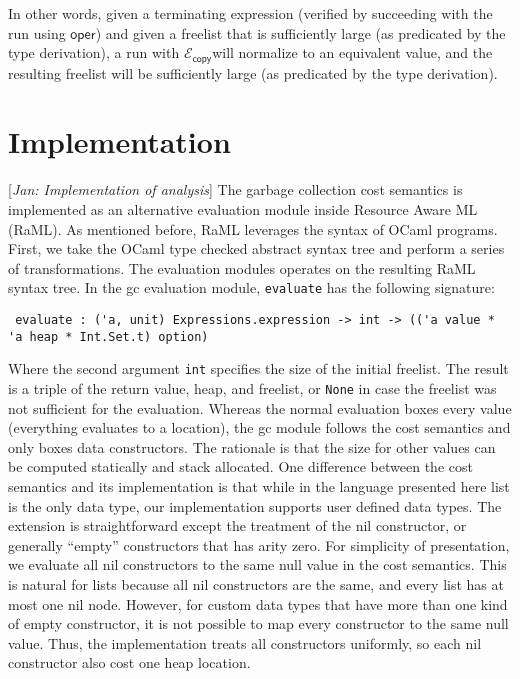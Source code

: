 \documentclass{easychair}
\newcommand{\ms}[1]{\ensuremath{\mathsf{#1}}}
\newcommand{\jan}[1]{{\color{red} [\emph{Jan: #1}]}}
\newcommand{\copySem}{\ensuremath{\mathcal{E}_{\ms{copy}}}}
\theoremstyle{definition}
\begin{document}
In other words, given a terminating expression (verified by succeeding with the run using \ms{oper})
and given a freelist that is sufficiently large (as predicated by the type derivation), 
a run with \copySem will normalize to an equivalent value, and the resulting freelist 
will be sufficiently large (as predicated by the type derivation).






\section{Implementation}
\label{sect:implementation}

\jan{Implementation of analysis}
The garbage collection cost semantics is implemented as an alternative evaluation module inside
Resource Aware ML (RaML). As mentioned before, RaML leverages the syntax of OCaml programs. 
First, we take the OCaml type checked abstract syntax tree and perform a series of transformations. 
The evaluation modules operates on the resulting RaML syntax tree. 
In the gc evaluation module, \texttt{evaluate} has the following signature:

\begin{verbatim}
 evaluate : ('a, unit) Expressions.expression -> int -> (('a value * 'a heap * Int.Set.t) option) 
\end{verbatim}

Where the second argument \texttt{int} specifies the size of the initial freelist.
The result is a triple of the return value, heap, and freelist, or \texttt{None} 
in case the freelist was not sufficient for the evaluation.
Whereas the normal evaluation boxes every value (everything evaluates to a location), 
the gc module follows the cost semantics and only boxes data constructors. The rationale is
that the size for other values can be computed statically and stack allocated. One difference
between the cost semantics and its implementation is that while in the language presented here
list is the only data type, our implementation supports user defined data types. The extension
is straightforward except the treatment of the nil constructor, or generally ``empty'' constructors
that has arity zero. For simplicity of presentation, we evaluate all nil constructors to
the same null value in the cost semantics. This is natural for lists because all nil constructors 
are the same, and every list has at most one nil node. However, for custom data types that have 
more than one kind of empty constructor, it is not possible to map every constructor to the same 
null value. Thus, the implementation treats all constructors uniformly, so each nil constructor
also cost one heap location. 
\end{document}
